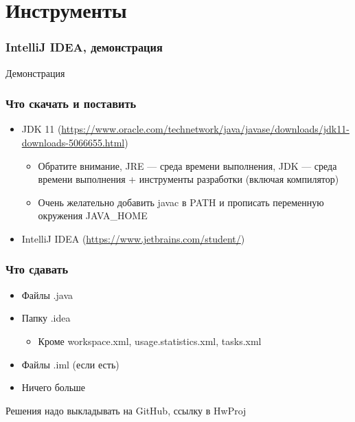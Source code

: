 \documentclass[xetex,mathserif,serif]{beamer}
\begin{document}
	\section{Инструменты}

	\begin{frame}
		\frametitle{IntelliJ IDEA, демонстрация}
		\begin{center}
			\huge{Демонстрация}
		\end{center}
	\end{frame}

	\begin{frame}
		\frametitle{Что скачать и поставить}
		\begin{itemize}
			\item JDK 11 (\url{https://www.oracle.com/technetwork/java/javase/downloads/jdk11-downloads-5066655.html})
			\begin{itemize}
				\item Обратите внимание, JRE --- среда времени выполнения, JDK --- среда времени выполнения + инструменты разработки (включая компилятор)
				\item Очень желательно добавить javac в PATH и прописать переменную окружения JAVA\_HOME
			\end{itemize}
			\item IntelliJ IDEA (\url{https://www.jetbrains.com/student/})
		\end{itemize}
	\end{frame}

	\begin{frame}
		\frametitle{Что сдавать}
		\begin{itemize}
			\item Файлы .java
			\item Папку .idea
			\begin{itemize}
				\item Кроме workspace.xml, usage.statistics.xml, tasks.xml
			\end{itemize}
			\item Файлы .iml (если есть)
			\item Ничего больше
		\end{itemize}
		Решения надо выкладывать на GitHub, ссылку в HwProj
	\end{frame}
\end{document}
